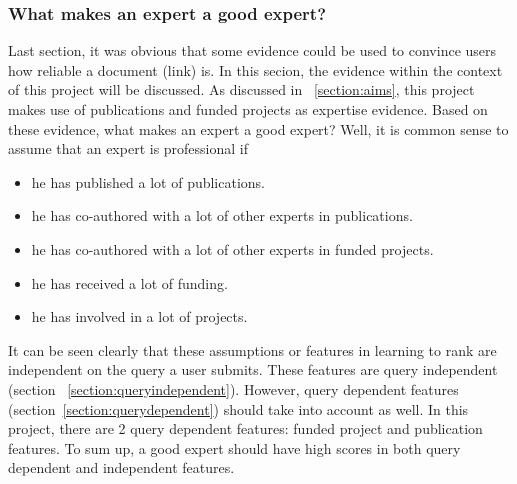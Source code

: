\subsubsection{What makes an expert a good expert?}\label{section:goodexpert}
Last section, it was obvious that some evidence could be used to convince users how reliable a document (link) is. In this secion, the evidence within
the context of this project will be discussed. As discussed in ~\ref{section:aims}, this project makes use of publications and funded projects as 
expertise evidence. Based on these evidence, what makes an expert a good expert? Well, it is common sense to assume that an expert is professional if 
\begin{itemize}
 \item he has published a lot of publications.
 \item he has co-authored with a lot of other experts in publications.
 \item he has co-authored with a lot of other experts in funded projects.
 \item he has received a lot of funding.
 \item he has involved in a lot of projects.
\end{itemize}

It can be seen clearly that these assumptions or features in learning to rank are independent on the query a user submits. These features are query independent
(section ~\ref{section:queryindependent}). However, query dependent features (section~\ref{section:querydependent}) should take into account as well. 
In this project, there are 2 query dependent features: funded project and publication features. To sum up, a good expert should have high scores in
both query dependent and independent features.

